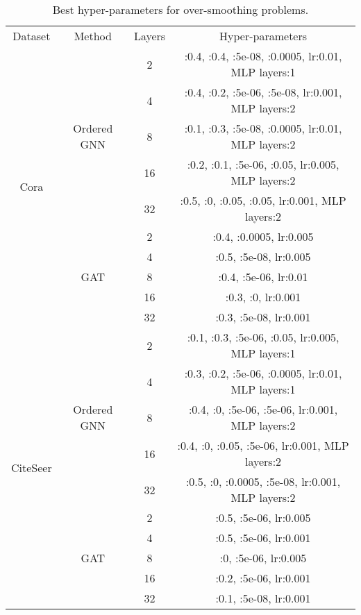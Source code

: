 \documentclass{article}
\begin{document}
\begin{table}
\caption{Best hyper-parameters for over-smoothing problems.}
\label{table.hyper.over_smoothing}
\centering
\resizebox{\textwidth}{!}
{
\begin{tabular}{cc|c|c}

\toprule
Dataset & Method & Layers & Hyper-parameters\\
\cline{1-4}

\multirow{10}{*}{Cora} & \multirow{5}{*}{Ordered GNN} & 2 & :0.4, :0.4, :5e-08, :0.0005, lr:0.01, MLP layers:1\\
\cline{3-4}
&& 4 & :0.4, :0.2, :5e-06, :5e-08, lr:0.001, MLP layers:2\\
\cline{3-4}
&& 8 & :0.1, :0.3, :5e-08, :0.0005, lr:0.01, MLP layers:2\\
\cline{3-4}
&& 16 & :0.2, :0.1, :5e-06, :0.05, lr:0.005, MLP layers:2\\
\cline{3-4}
&& 32 & :0.5, :0, :0.05, :0.05, lr:0.001, MLP layers:2\\
\cline{2-4}


& \multirow{5}{*}{GAT} & 2 & :0.4, :0.0005, lr:0.005\\
\cline{3-4}
&& 4 & :0.5, :5e-08, lr:0.005\\
\cline{3-4}
&& 8 & :0.4, :5e-06, lr:0.01\\
\cline{3-4}
&& 16 & :0.3, :0, lr:0.001\\
\cline{3-4}
&& 32 & :0.3, :5e-08, lr:0.001\\
\cline{1-4}





\multirow{10}{*}{CiteSeer} & \multirow{5}{*}{Ordered GNN} & 2 & :0.1, :0.3, :5e-06, :0.05, lr:0.005, MLP layers:1\\
\cline{3-4}
&& 4 & :0.3, :0.2, :5e-06, :0.0005, lr:0.01, MLP layers:1\\
\cline{3-4}
&& 8 & :0.4, :0, :5e-06, :5e-06, lr:0.001, MLP layers:2\\
\cline{3-4}
&& 16 & :0.4, :0, :0.05, :5e-06, lr:0.001, MLP layers:2\\
\cline{3-4}
&& 32 & :0.5, :0, :0.0005, :5e-08, lr:0.001, MLP layers:2\\
\cline{2-4}


& \multirow{5}{*}{GAT} & 2 & :0.5, :5e-06, lr:0.005\\
\cline{3-4}
&& 4 & :0.5, :5e-06, lr:0.001\\
\cline{3-4}
&& 8 & :0, :5e-06, lr:0.005\\
\cline{3-4}
&& 16 & :0.2, :5e-06, lr:0.001\\
\cline{3-4}
&& 32 & :0.1, :5e-08, lr:0.001\\
\cline{1-4}







\end{tabular}}
\end{table}
\end{document}
